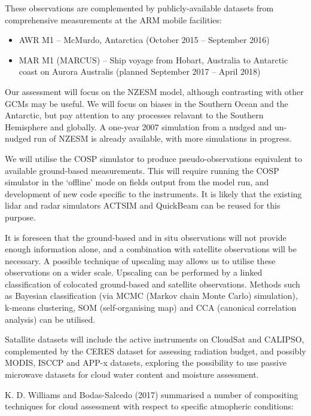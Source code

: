 These observations are complemented by publicly-available datasets from
comprehensive measurements at the ARM mobile facilities:

\begin{itemize}
\itemsep1pt\parskip0pt
\item
  AWR M1 -- McMurdo, Antarctica (October 2015 -- September 2016)
\item
  MAR M1 (MARCUS) -- Ship voyage from Hobart, Australia to Antarctic
  coast on Aurora Australis (planned September 2017 -- April 2018)
\end{itemize}

Our assessment will focus on the NZESM model, although contrasting with
other GCMs may be useful. We will focus on biases in the Southern Ocean
and the Antarctic, but pay attention to any processes relavant to the
Southern Hemisphere and globally. A one-year 2007 simulation from a
nudged and un-nudged run of NZESM is already available, with more
simulations in progress.

We will utilise the COSP simulator to produce pseudo-observations
equivalent to available ground-based measurements. This will require
running the COSP simulator in the `offline' mode on fields output from
the model run, and development of new code specific to the instruments.
It is likely that the existing lidar and radar simulators ACTSIM and
QuickBeam can be reused for this purpose.

It is foreseen that the ground-based and in situ observations will not
provide enough information alone, and a combination with satellite
observations will be necessary. A possible technique of upscaling may
allows us to utilise these observations on a wider scale. Upscaling can
be performed by a linked classification of colocated ground-based and
satellite observations. Methods such as Bayesian classification (via
MCMC (Markov chain Monte Carlo) simulation), k-means clustering, SOM
(self-organising map) and CCA (canonical correlation analysis) can be
utilised.

Satallite datasets will include the active instruments on CloudSat and
CALIPSO, complemented by the CERES dataset for assessing radiation
budget, and possibly MODIS, ISCCP and APP-x datasets, exploring the
possibility to use passive microwave datasets for cloud water content
and moisture assessment.

K. D. Williams and Bodas-Salcedo (2017) summarised a number of
compositing techniques for cloud assessment with respect to specific
atmopheric conditions:

